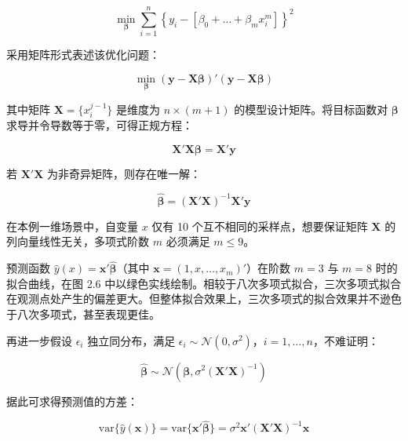 \documentclass{ctexart}
\begin{document}
\begin{equation*}
\min_{\boldsymbol{\beta}}\sum_{i=1}^n\left\{y_i-[\beta_0+\dots+\beta_mx_i^m]\right\}^2
\end{equation*}

采用矩阵形式表述该优化问题：

\begin{equation*}
\min_{\boldsymbol{\beta}} (\boldsymbol{y}-\boldsymbol{X}\boldsymbol{\beta})'(\boldsymbol{y}-\boldsymbol{X}\boldsymbol{\beta})
\end{equation*}

其中矩阵 $\boldsymbol{X}=\{x_i^{j-1}\}$ 是维度为 $n\times(m+1)$ 的模型设计矩阵。将目标函数对 $\boldsymbol{\beta}$ 求导并令导数等于零，可得正规方程：

\begin{equation*}
\boldsymbol{X}'\boldsymbol{X}\boldsymbol{\beta}=\boldsymbol{X}'\boldsymbol{y}
\end{equation*}

若 $\boldsymbol{X}'\boldsymbol{X}$ 为非奇异矩阵，则存在唯一解：

\begin{equation*}
\widehat{\boldsymbol{\beta}}=(\boldsymbol{X}'\boldsymbol{X})^{-1}\boldsymbol{X}'\boldsymbol{y}
\tag{2.32}
\end{equation*}

在本例一维场景中，自变量 $x$ 仅有 10 个互不相同的采样点，想要保证矩阵 $\boldsymbol{X}$ 的列向量线性无关，多项式阶数 $m$ 必须满足 $m\le9$。

预测函数 $\widehat{y}(x)=\boldsymbol{x}'\widehat{\boldsymbol{\beta}}$（其中 $\boldsymbol{x}=(1,x,\dots,x_m)'$）在阶数 $m=3$ 与 $m=8$ 时的拟合曲线，在图 2.6 中以绿色实线绘制。相较于八次多项式拟合，三次多项式拟合在观测点处产生的偏差更大。但整体拟合效果上，三次多项式的拟合效果并不逊色于八次多项式，甚至表现更佳。

再进一步假设 $\epsilon_i$ 独立同分布，满足 $\epsilon_i\sim\mathcal{N}(0,\sigma^2)，i=1,\dots,n$，不难证明：

\begin{equation*}
\widehat{\boldsymbol{\beta}}\sim\mathcal{N}\left(\boldsymbol{\beta},\sigma^2(\boldsymbol{X}'\boldsymbol{X})^{-1}\right)
\tag{2.33}
\end{equation*}

据此可求得预测值的方差：

\begin{equation*}
\mathrm{var}\{\widehat{y}(\boldsymbol{x})\}=\mathrm{var}\{\boldsymbol{x}'\widehat{\boldsymbol{\beta}}\}=\sigma^2\boldsymbol{x}'(\boldsymbol{X}'\boldsymbol{X})^{-1}\boldsymbol{x}
\end{equation*}
\end{document}
